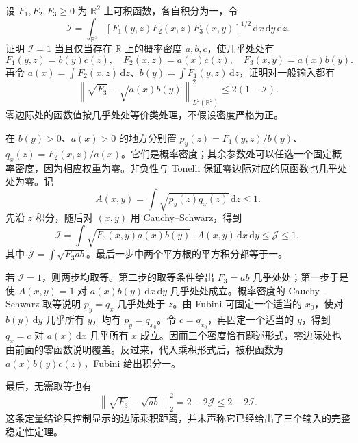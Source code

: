 \begin{optionalexercise}\label{b2:ex:25-new-2}
设 \(F_1,F_2,F_3\geq0\) 为 \(\mathbb R^2\) 上可积函数，各自积分为一，令
\[
 \mathcal I=\int_{\mathbb R^3}
       [F_1(y,z)F_2(x,z)F_3(x,y)]^{1/2}\,\mathrm dx\,\mathrm dy\,\mathrm dz.
\]
证明 \(\mathcal I=1\) 当且仅当存在 \(\mathbb R\) 上的概率密度 \(a,b,c\)，使几乎处处有
\[
 F_1(y,z)=b(y)c(z),
 \quad F_2(x,z)=a(x)c(z),
 \quad F_3(x,y)=a(x)b(y).
\]
再令 \(a(x)=\int F_2(x,z)\,\mathrm dz\)、\(b(y)=\int F_1(y,z)\,\mathrm dz\)，证明对一般输入都有
\[
 \left\|\sqrt{F_3}-\sqrt{a(x)b(y)}\right\|_{L^2(\mathbb R^2)}^2
       \leq2(1-\mathcal I).
\]
零边际处的函数值按几乎处处等价类处理，不假设密度严格为正。
\end{optionalexercise}
\begin{solution}
在 \(b(y)>0\)、\(a(x)>0\) 的地方分别置
\(p_y(z)=F_1(y,z)/b(y)\)、\(q_x(z)=F_2(x,z)/a(x)\)。它们是概率密度；其余参数处可以任选一个固定概率密度，因为相应权重为零。非负性与 Tonelli 保证零边际对应的原函数也几乎处处为零。记
\[
 A(x,y)=\int\sqrt{p_y(z)q_x(z)}\,\mathrm dz\leq1.
\]
先沿 \(z\) 积分，随后对 \((x,y)\) 用 Cauchy--Schwarz，得到
\[
 \mathcal I=\int\sqrt{F_3(x,y)a(x)b(y)}\cdot A(x,y)\,\mathrm dx\,\mathrm dy
 \leq\mathcal J\leq1,
\]
其中 \(\mathcal J=\int\sqrt{F_3ab}\)。最后一步中两个平方根的平方积分都等于一。

若 \(\mathcal I=1\)，则两步均取等。第二步的取等条件给出 \(F_3=ab\) 几乎处处；第一步于是使 \(A(x,y)=1\) 对 \(a(x)b(y)\,\mathrm dx\,\mathrm dy\) 几乎处处成立。概率密度的 Cauchy--Schwarz 取等说明 \(p_y=q_x\) 几乎处处于 \(z\)。由 Fubini 可固定一个适当的 \(x_0\)，使对 \(b(y)\,\mathrm dy\) 几乎所有 \(y\)，均有 \(p_y=q_{x_0}\)。令 \(c=q_{x_0}\)，再固定一个适当的 \(y\)，得到 \(q_x=c\) 对 \(a(x)\,\mathrm dx\) 几乎所有 \(x\) 成立。因而三个密度恰有题述形式，零边际处也由前面的零函数说明覆盖。反过来，代入乘积形式后，被积函数为 \(a(x)b(y)c(z)\)，Fubini 给出积分一。

最后，无需取等也有
\[
 \left\|\sqrt{F_3}-\sqrt{ab}\right\|_2^2
       =2-2\mathcal J\leq2-2\mathcal I.
\]
这条定量结论只控制显示的边际乘积距离，并未声称它已经给出了三个输入的完整稳定性定理。
\end{solution}

